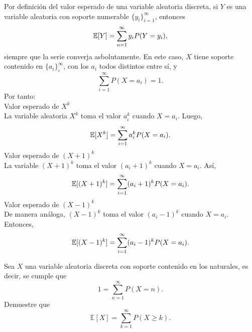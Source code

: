 \documentclass[12pt,a4paper]{article}
\begin{document}
    \begin{solucion}
        Por definición del valor esperado de una variable aleatoria discreta, si $Y$ es una
        variable aleatoria con soporte numerable $\{y_{i}\}_{i=1}^{\infty}$, entonces
        \begin{equation*}
            \mathbb{E}[Y]=\sum_{n=1}^{\infty}y_{i}P(Y=y_{i}),
        \end{equation*}
        siempre que la serie converja asbolutamente. En este caso, $X$ tiene soporte contenido
        en $\{a_{i}\}_{i}^{\infty}$, con los $a_{i}$ todos distintos entre sí, y
        \begin{equation*}
            \sum_{i=1}^{\infty}P(X=a_{i})=1.
        \end{equation*}
        Por tanto:\\
        Valor esperado de $X^{k}$\\
        La variable aleatoria $X^{k}$ toma el valor $a_{i}^{k}$ cuando $X=a_{i}$. Luego,
        \begin{equation*}
            \mathbb{E}[X^{k}]=\sum_{i=1}^{\infty}a_{i}^{k}P(X=a_{i}).
        \end{equation*}
        Valor esperado de $(X+1)^{k}$\\
        La variable $(X+1)^{k}$ toma el valor $(a_{i}+1)^{k}$ cuando $X=a_{i}$. Así,
        \begin{equation*}
            \mathbb{E}[(X+1)^{k}]=\sum_{i=1}^{\infty}(a_{i}+1)^{k}P(X=a_{i}).
        \end{equation*}
        Valor esperado de $(X-1)^{k}$\\
        De manera análoga, $(X-1)^{k}$ toma el valor $(a_{i}-1)^{k}$ cuando $X=a_{i}$. Entonces,
        \begin{equation*}
            \mathbb{E}[(X-1)^{k}]=\sum_{i=1}^{\infty}(a_{i}-1)^{k}P(X=a_{i}).
        \end{equation*}
    \end{solucion}

    \begin{mdframed}[style=mdpinkbox, frametitle={Ejercicio 2}]
        Sea $X$ una variable aleatoria discreta con soporte contenido en los naturales, es decir, se cumple que
        \begin{equation*}
            1 = \sum_{n=1}^{\infty} P(X = n).
        \end{equation*}
        Demuestre que
        \begin{equation*}
            \mathbb{E}[X] = \sum_{k=1}^{\infty} P(X \geq k).
        \end{equation*}
    \end{mdframed}
\end{document}
